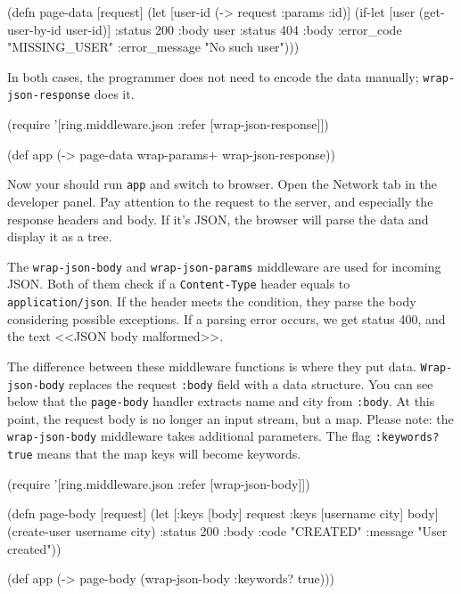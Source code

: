 \else

\begin{english}
  \begin{clojure}
(defn page-data [request]
  (let [user-id (-> request :params :id)]
    (if-let [user (get-user-by-id user-id)]
      {:status 200 :body user}
      {:status 404
       :body {:error_code "MISSING_USER"
              :error_message "No such user"}})))
  \end{clojure}
\end{english}

\fi

\noindent In both cases, the programmer does not need to encode the data manually; \verb|wrap-json-response| does it.

\begin{english}
  \begin{clojure}
(require '[ring.middleware.json
           :refer [wrap-json-response]])

(def app (-> page-data
             wrap-params+
             wrap-json-response))
  \end{clojure}
\end{english}

Now your should run \verb|app| and switch to browser. Open the Network tab in the developer panel. Pay attention to the request to the server, and especially the response headers and body. If it's JSON, the browser will parse the data and display it as a tree.

The \verb|wrap-json-body| and \verb|wrap-json-params| middleware are used for incoming JSON. Both of them check if a \verb|Content-Type| header equals to \verb|application/json|. If the header meets the condition, they parse the body considering possible exceptions. If a parsing error occurs, we get status 400, and the text <<JSON body malformed>>.

The difference between these middleware functions is where they put data. \verb|Wrap-json-body| replaces the request \verb|:body| field with a data structure. You can see below that the \verb|page-body| handler extracts name and city from \verb|:body|. At this point, the request body is no longer an input stream, but a map. Please note: the \verb|wrap-json-body| middleware takes additional parameters. The flag \verb|:keywords? true| means that the map keys will become keywords.

\ifx\DEVICETYPE\MOBILE

\begin{english}
  \begin{clojure}
(require '[ring.middleware.json
           :refer [wrap-json-body]])

(defn page-body [request]
  (let [{:keys [body]} request
        {:keys [username city]} body]
    (create-user username city)
    {:status 200
     :body {:code "CREATED"
            :message "User created"}}))

(def app
  (->
    page-body
    (wrap-json-body {:keywords? true})))
  \end{clojure}
\end{english}

